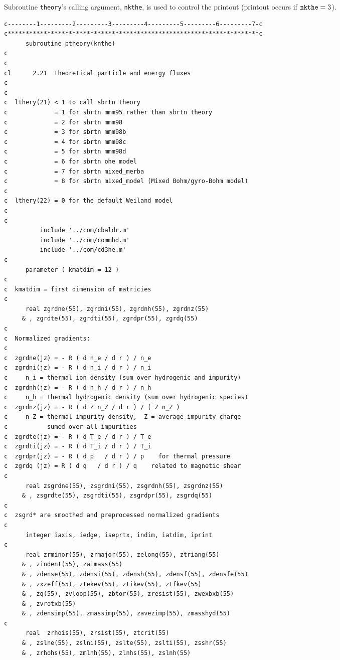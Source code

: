 Subroutine {\tt theory}'s calling argument,
{\tt nkthe}, is used to control the printout
(printout occurs if ${\tt nkthe} = 3$).

\begin{verbatim}
c--------1---------2---------3---------4---------5---------6---------7-c
c**********************************************************************c
      subroutine ptheory(knthe)
c
c
cl      2.21  theoretical particle and energy fluxes
c
c
c  lthery(21) < 1 to call sbrtn theory
c             = 1 for sbrtn mmm95 rather than sbrtn theory
c             = 2 for sbrtn mmm98
c             = 3 for sbrtn mmm98b
c             = 4 for sbrtn mmm98c
c             = 5 for sbrtn mmm98d
c             = 6 for sbrtn ohe model
c             = 7 for sbrtn mixed_merba
c             = 8 for sbrtn mixed_model (Mixed Bohm/gyro-Bohm model)
c
c  lthery(22) = 0 for the default Weiland model
c
c
          include '../com/cbaldr.m'
          include '../com/commhd.m'
          include '../com/cd3he.m'
c
      parameter ( kmatdim = 12 )
c
c  kmatdim = first dimension of matricies
c
      real zgrdne(55), zgrdni(55), zgrdnh(55), zgrdnz(55)
     & , zgrdte(55), zgrdti(55), zgrdpr(55), zgrdq(55)
c
c  Normalized gradients:
c
c  zgrdne(jz) = - R ( d n_e / d r ) / n_e
c  zgrdni(jz) = - R ( d n_i / d r ) / n_i
c     n_i = thermal ion density (sum over hydrogenic and impurity)
c  zgrdnh(jz) = - R ( d n_h / d r ) / n_h
c     n_h = thermal hydrogenic density (sum over hydrogenic species)
c  zgrdnz(jz) = - R ( d Z n_Z / d r ) / ( Z n_Z )
c     n_Z = thermal impurity density,  Z = average impurity charge
c           sumed over all impurities
c  zgrdte(jz) = - R ( d T_e / d r ) / T_e
c  zgrdti(jz) = - R ( d T_i / d r ) / T_i
c  zgrdpr(jz) = - R ( d p   / d r ) / p    for thermal pressure
c  zgrdq (jz) = R ( d q   / d r ) / q    related to magnetic shear
c
      real zsgrdne(55), zsgrdni(55), zsgrdnh(55), zsgrdnz(55)
     & , zsgrdte(55), zsgrdti(55), zsgrdpr(55), zsgrdq(55)
c
c  zsgrd* are smoothed and preprocessed normalized gradients
c
      integer iaxis, iedge, iseprtx, indim, iatdim, iprint
c
      real zrminor(55), zrmajor(55), zelong(55), ztriang(55)
     & , zindent(55), zaimass(55)
     & , zdense(55), zdensi(55), zdensh(55), zdensf(55), zdensfe(55)
     & , zxzeff(55), ztekev(55), ztikev(55), ztfkev(55)
     & , zq(55), zvloop(55), zbtor(55), zresist(55), zwexbxb(55)
     & , zvrotxb(55)
     & , zdensimp(55), zmassimp(55), zavezimp(55), zmasshyd(55)
c
      real  zrhois(55), zrsist(55), ztcrit(55)
     & , zslne(55), zslni(55), zslte(55), zslti(55), zsshr(55)
     & , zrhohs(55), zmlnh(55), zlnhs(55), zslnh(55)

\end{verbatim}
